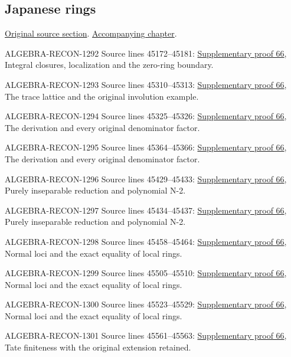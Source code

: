 \subsection{Japanese rings}
\hypertarget{algebra-source-section-japanese}{}
\noindent\href{https://github.com/stacks/stacks-project/blob/a04446e57ec1fbc252a871afcec7752fb2807b14/algebra.tex\#L45128}{Original source section}. \href{algebra.pdf\#nameddest=section-japanese}{Accompanying chapter}.

\begin{AlgebraSourceRoutes}
\item[ALGEBRA-RECON-1292] Source lines 45172--45181: \hyperlink{algebra_japanese_notes_20260929}{Supplementary proof 66}, Integral closures, localization and the zero-ring boundary.
\item[ALGEBRA-RECON-1293] Source lines 45310--45313: \hyperlink{algebra_japanese_notes_20260929}{Supplementary proof 66}, The trace lattice and the original involution example.
\item[ALGEBRA-RECON-1294] Source lines 45325--45326: \hyperlink{algebra_japanese_notes_20260929}{Supplementary proof 66}, The derivation and every original denominator factor.
\item[ALGEBRA-RECON-1295] Source lines 45364--45366: \hyperlink{algebra_japanese_notes_20260929}{Supplementary proof 66}, The derivation and every original denominator factor.
\item[ALGEBRA-RECON-1296] Source lines 45429--45433: \hyperlink{algebra_japanese_notes_20260929}{Supplementary proof 66}, Purely inseparable reduction and polynomial N-2.
\item[ALGEBRA-RECON-1297] Source lines 45434--45437: \hyperlink{algebra_japanese_notes_20260929}{Supplementary proof 66}, Purely inseparable reduction and polynomial N-2.
\item[ALGEBRA-RECON-1298] Source lines 45458--45464: \hyperlink{algebra_japanese_notes_20260929}{Supplementary proof 66}, Normal loci and the exact equality of local rings.
\item[ALGEBRA-RECON-1299] Source lines 45505--45510: \hyperlink{algebra_japanese_notes_20260929}{Supplementary proof 66}, Normal loci and the exact equality of local rings.
\item[ALGEBRA-RECON-1300] Source lines 45523--45529: \hyperlink{algebra_japanese_notes_20260929}{Supplementary proof 66}, Normal loci and the exact equality of local rings.
\item[ALGEBRA-RECON-1301] Source lines 45561--45563: \hyperlink{algebra_japanese_notes_20260929}{Supplementary proof 66}, Tate finiteness with the original extension retained.
\end{AlgebraSourceRoutes}

